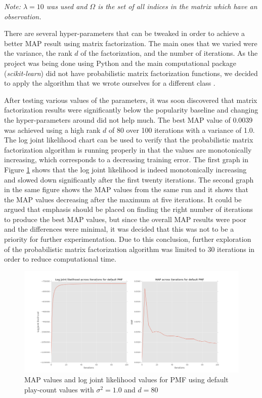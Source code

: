 \documentclass[11pt,preprint]{aastex}
\begin{document}
\emph{Note: $\lambda = 10$ was used and $\Omega$ is the set of all indices in the matrix which have an observation.}

There are several hyper-parameters that can be tweaked in order to achieve a better MAP result using matrix factorization. The main ones that we varied were the variance, the rank $d$ of the factorization, and the number of iterations. As the project was being done using Python and the main computational package (\emph{scikit-learn}) did not have probabilistic matrix factorization functions, we decided to apply the algorithm that we wrote ourselves for a different class \citep{koren2009matrix}. 
 
After testing various values of the parameters, it was soon discovered that matrix factorization results were significantly below the popularity baseline and changing the hyper-parameters around did not help much. The best MAP value of 0.0039 was achieved using a high rank $d$ of 80 over 100 iterations with a variance of 1.0. The log joint likelihood chart can be used to verify that the probabilistic matrix factorization algorithm is running properly in that the values are monotonically increasing, which corresponds to a decreasing training error. The first graph in Figure \ref{defaultPMF} shows that the log joint likelihood is indeed monotonically increasing and slowed down significantly after the first twenty iterations. The second graph in the same figure shows the MAP values from the same run and it shows that the MAP values decreasing after the maximum at five iterations. It could be argued that emphasis should be placed on finding the right number of iterations to produce the best MAP values, but since the overall MAP results were poor and the differences were minimal, it was decided that this was not to be a priority for further experimentation. Due to this conclusion, further exploration of the probabilistic matrix factorization algorithm was limited to 30 iterations in order to reduce computational time.

\begin{figure}[H] %
   \centering
   \includegraphics[width=6in]{../plots/final/defaultPMF.png} 
   \caption{MAP values and log joint likelihood values for PMF using default play-count values with $\sigma^2 = 1.0$ and $d = 80$}
   \label{defaultPMF}
\end{figure}
 
\end{document}
